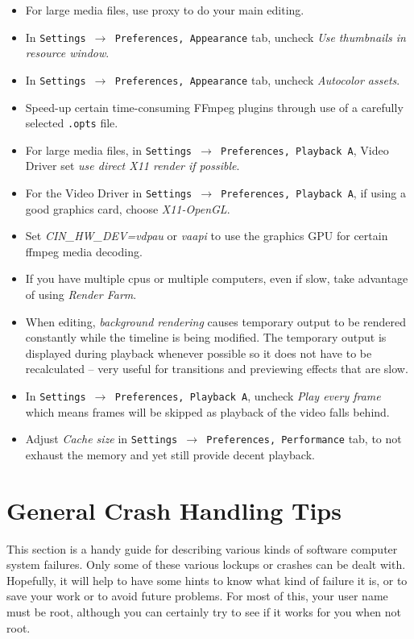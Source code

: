 \begin{itemize}
	\item For large media files, use proxy to do your main editing.
	\item In \texttt{Settings $\rightarrow$ Preferences, Appearance} tab, uncheck \textit{Use thumbnails in resource window}.
	\item In \texttt{Settings $\rightarrow$ Preferences, Appearance} tab, uncheck \textit{Autocolor assets}.
	\item  Speed-up certain time-consuming FFmpeg plugins through use of a carefully selected \texttt{.opts} file.
	\item For large media files, in \texttt{Settings $\rightarrow$ Preferences, Playback A}, Video Driver set \textit{use direct X11 render if possible}.
	\item For the Video Driver in \texttt{Settings $\rightarrow$ Preferences, Playback A}, if using a good graphics card, choose \textit{X11-OpenGL}.
	\item Set \textit{CIN\_HW\_DEV=vdpau} or \textit{vaapi} to use the graphics GPU for certain ffmpeg media decoding.
	\item If you have multiple cpus or multiple computers, even if slow, take advantage of using \textit{Render Farm}.
	\item When editing, \textit{background rendering} causes temporary output to be rendered constantly while the
	timeline is being modified. The temporary output is displayed during playback whenever possible so 
	it does not have to be recalculated -- very useful for transitions and previewing effects that are slow.
	\item In  \texttt{Settings $\rightarrow$ Preferences, Playback A}, uncheck \textit{Play every frame} which means frames will be skipped as playback of the video falls behind.
	\item Adjust \textit{Cache size} in \texttt{Settings $\rightarrow$ Preferences, Performance} tab, to not exhaust the memory and yet still provide decent playback.
\end{itemize}

\section{General Crash Handling Tips}%
\label{sec:general_crash_tips}

This section is a handy guide for describing various kinds of software computer system failures.  Only some of these various lockups or crashes can be dealt with.  Hopefully, it will help to have some hints to know what kind of failure it is, or to save your work or to avoid future problems.  For most of this, your user name must be root, although you can certainly try to see if it works for you when not root.

